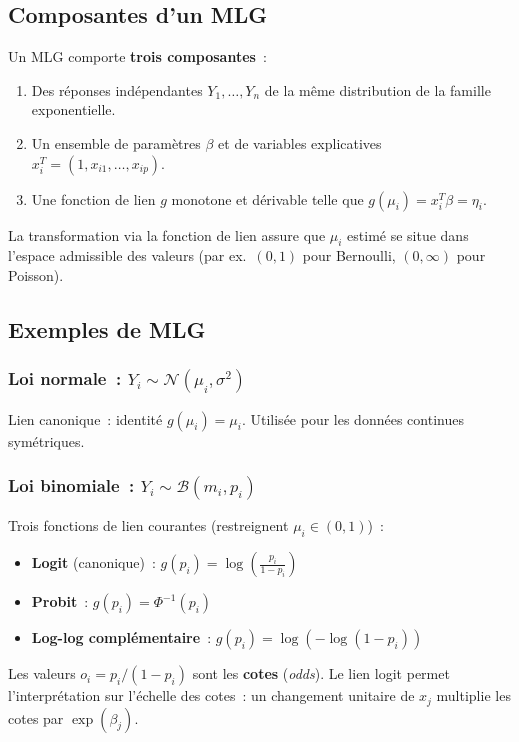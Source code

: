 \documentclass[11pt,letterpaper]{article}
\begin{document}
\subsection{Composantes d'un MLG}

Un MLG comporte \textbf{trois composantes}~:
\begin{enumerate}
\item Des réponses indépendantes $Y_1,\ldots,Y_n$ de la même distribution de la famille exponentielle.
\item Un ensemble de paramètres $\beta$ et de variables explicatives $x_i^T = (1, x_{i1},\ldots,x_{ip})$.
\item Une fonction de lien $g$ monotone et dérivable telle que $g(\mu_i) = x_i^T \beta = \eta_i$.
\end{enumerate}

La transformation via la fonction de lien assure que $\mu_i$ estimé se situe dans l'espace admissible des valeurs (par ex.\ $(0,1)$ pour Bernoulli, $(0,\infty)$ pour Poisson).

\subsection{Exemples de MLG}

\subsubsection{Loi normale~: $Y_i \sim \mathcal{N}(\mu_i, \sigma^2)$}
Lien canonique~: identité $g(\mu_i) = \mu_i$. Utilisée pour les données continues symétriques.

\subsubsection{Loi binomiale~: $Y_i \sim \mathcal{B}(m_i, p_i)$}
Trois fonctions de lien courantes (restreignent $\mu_i \in (0,1)$)~:
\begin{itemize}
\item \textbf{Logit} (canonique)~: $g(p_i) = \log\left(\frac{p_i}{1-p_i}\right)$
\item \textbf{Probit}~: $g(p_i) = \Phi^{-1}(p_i)$
\item \textbf{Log-log complémentaire}~: $g(p_i) = \log(-\log(1-p_i))$
\end{itemize}

Les valeurs $o_i = p_i/(1-p_i)$ sont les \textbf{cotes} (\textit{odds}). Le lien logit permet l'interprétation sur l'échelle des cotes~: un changement unitaire de $x_j$ multiplie les cotes par $\exp(\beta_j)$.
\end{document}
